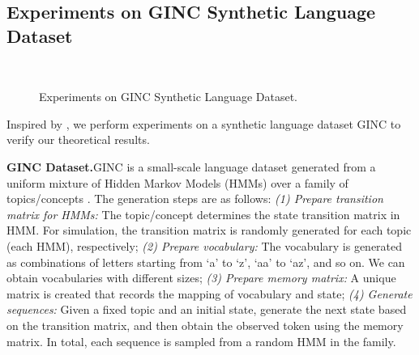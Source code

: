 \subsection{Experiments on GINC Synthetic Language Dataset}\label{app:GINC}
\begin{figure*}
    \centering
    \vspace{-1em}
    \hspace{-1em}
    \hspace{-1em}
    \hspace{-1em}
    \\
    \hspace{-0.7em}
    \hspace{-1em}
    \hspace{-1em}
    \caption{Experiments on GINC Synthetic Language Dataset.}
    \label{fig:exp-GINC}
\end{figure*} 

Inspired by \cite{xie2021explanation}, we perform experiments on a synthetic language dataset GINC to verify our theoretical results.

\textbf{GINC Dataset.}\quad GINC is a small-scale language dataset generated from a uniform mixture of Hidden Markov Models (HMMs) over a family of topics/concepts \citep{xie2021explanation}. The generation steps are as follows: \textit{(1) Prepare transition matrix for HMMs:} The topic/concept determines the state transition matrix in HMM. For simulation, the transition matrix is randomly generated for each topic (each HMM), respectively; \textit{(2) Prepare vocabulary:} The vocabulary is generated as combinations of letters starting from `a' to `z', `aa' to `az', and so on. We can obtain vocabularies with different sizes; \textit{(3) Prepare memory matrix:} A unique matrix is created that records the mapping of vocabulary and state; \textit{(4) Generate sequences:} Given a fixed topic and an initial state, generate the next state based on the transition matrix, and then obtain the observed token using the memory matrix. In total, each sequence is sampled from a random HMM in the family.


